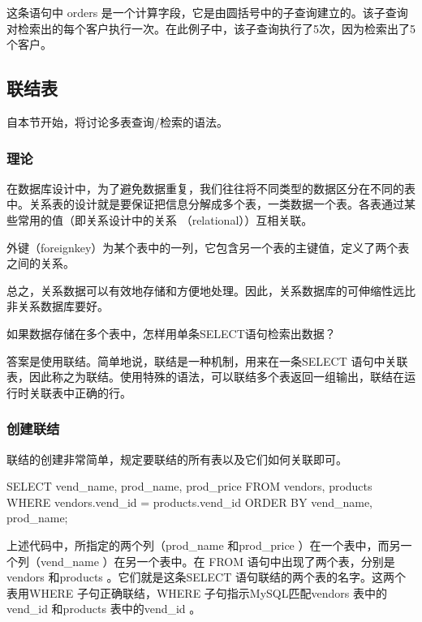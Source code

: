 这条语句中 orders 是一个计算字段，它是由圆括号中的子查询建立的。该子查询对检索出的每个客户执行一次。在此例子中，该子查询执行了5次，因为检索出了5个客户。


\subsection{联结表}

自本节开始，将讨论多表查询/检索的语法。

\subsubsection{理论}

在数据库设计中，为了避免数据重复，我们往往将不同类型的数据区分在不同的表中。关系表的设计就是要保证把信息分解成多个表，一类数据一个表。各表通过某些常用的值（即关系设计中的关系 （relational））互相关联。

外键（foreignkey）为某个表中的一列，它包含另一个表的主键值，定义了两个表之间的关系。

总之，关系数据可以有效地存储和方便地处理。因此，关系数据库的可伸缩性远比非关系数据库要好。

如果数据存储在多个表中，怎样用单条SELECT语句检索出数据？

答案是使用联结。简单地说，联结是一种机制，用来在一条SELECT 语句中关联表，因此称之为联结。使用特殊的语法，可以联结多个表返回一组输出，联结在运行时关联表中正确的行。

\subsubsection{创建联结}

联结的创建非常简单，规定要联结的所有表以及它们如何关联即可。

\begin{sql}
SELECT vend_name, prod_name, prod_price
    FROM vendors, products
    WHERE vendors.vend_id = products.vend_id
    ORDER BY vend_name, prod_name;
\end{sql}

上述代码中，所指定的两个列（prod\_name 和prod\_price ）在一个表中，而另一个列（vend\_name ）在另一个表中。在 FROM 语句中出现了两个表，分别是vendors 和products 。它们就是这条SELECT 语句联结的两个表的名字。这两个表用WHERE 子句正确联结，WHERE 子句指示MySQL匹配vendors 表中的vend\_id 和products 表中的vend\_id 。

